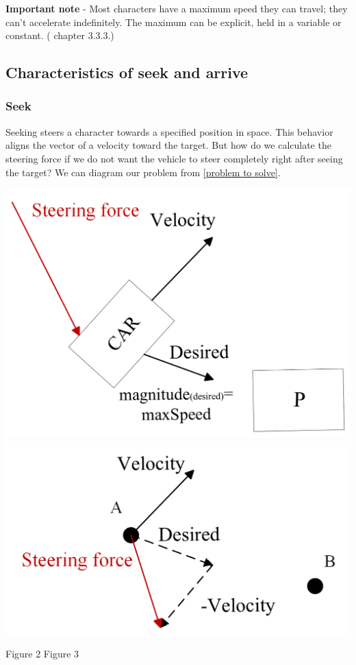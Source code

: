\documentclass[10pt,twoside,english,a4paper]{article}
\begin{document}
\textbf{Important note} - Most characters have a maximum speed they can travel; 
they can’t accelerate indefinitely. The maximum can be
explicit, held in a variable or constant. (\cite{Millington} chapter 3.3.3.)

\subsection{Characteristics of seek and arrive } \label{characterictics of seek and arrive}

\subsubsection{Seek} \label{seek}

Seeking steers a character towards a specified position in space. 
This behavior aligns the vector of a velocity toward the target. 
But how do we calculate the steering force if we do not want the 
vehicle to steer completely right after seeing the target? We can 
diagram our problem from \ref{problem to solve}.

\includegraphics[scale=0.22]{diagram_car.png} 	
\includegraphics[scale=0.22]{diagram_steeringForce.png}\par
\quad Figure 2 
\hspace*{\fill} Figure 3
\bigbreak
\end{document}
